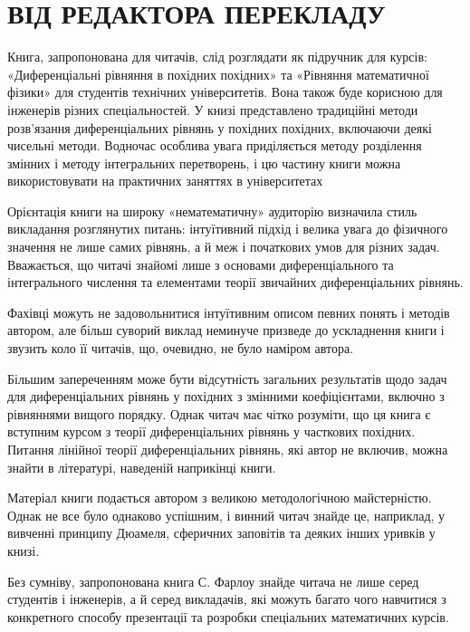 \documentclass[
  ukrainian,
]{article}
\begin{document}
\section{ВІД РЕДАКТОРА
ПЕРЕКЛАДУ}\label{ux432ux456ux434-ux440ux435ux434ux430ux43aux442ux43eux440ux430-ux43fux435ux440ux435ux43aux43bux430ux434ux443}

Книга, запропонована для читачів, слід розглядати як підручник для
курсів: «Диференціальні рівняння в похідних похідних» та «Рівняння
математичної фізики» для студентів технічних університетів. Вона також
буде корисною для інженерів різних спеціальностей. У книзі представлено
традиційні методи розв'язання диференціальних рівнянь у похідних
похідних, включаючи деякі чисельні методи. Водночас особлива увага
приділяється методу розділення змінних і методу інтегральних
перетворень, і цю частину книги можна використовувати на практичних
заняттях в університетах

Орієнтація книги на широку «нематематичну» аудиторію визначила стиль
викладання розглянутих питань: інтуїтивний підхід і велика увага до
фізичного значення не лише самих рівнянь, а й меж і початкових умов для
різних задач. Вважається, що читачі знайомі лише з основами
диференціального та інтегрального числення та елементами теорії
звичайних диференціальних рівнянь.

Фахівці можуть не задовольнитися інтуїтивним описом певних понять і
методів автором, але більш суворий виклад неминуче призведе до
ускладнення книги і звузить коло її читачів, що, очевидно, не було
наміром автора.

Більшим запереченням може бути відсутність загальних результатів щодо
задач для диференціальних рівнянь у похідних з змінними коефіцієнтами,
включно з рівняннями вищого порядку. Однак читач має чітко розуміти, що
ця книга є вступним курсом з теорії диференціальних рівнянь у часткових
похідних. Питання лінійної теорії диференціальних рівнянь, які автор не
включив, можна знайти в літературі, наведеній наприкінці книги.

Матеріал книги подається автором з великою методологічною майстерністю.
Однак не все було однаково успішним, і винний читач знайде це,
наприклад, у вивченні принципу Дюамеля, сферичних заповітів та деяких
інших уривків у книзі.

Без сумніву, запропонована книга С. Фарлоу знайде читача не лише серед
студентів і інженерів, а й серед викладачів, які можуть багато чого
навчитися з конкретного способу презентації та розробки спеціальних
математичних курсів.
\end{document}
